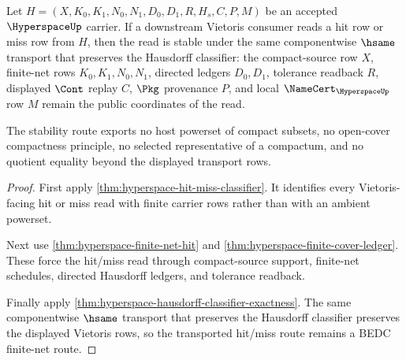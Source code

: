 \begin{theorem}
\label{thm:hyperspace-vietoris-hit-miss-stability}
Let $H=(X,K_0,K_1,N_0,N_1,D_0,D_1,R,H_s,C,P,M)$ be an accepted $\HyperspaceUp$ carrier. If a downstream Vietoris consumer reads a hit row or miss row from $H$, then the read is stable under the same componentwise $\hsame$ transport that preserves the Hausdorff classifier: the compact-source row $X$, finite-net rows $K_0,K_1,N_0,N_1$, directed ledgers $D_0,D_1$, tolerance readback $R$, displayed $\Cont$ replay $C$, $\Pkg$ provenance $P$, and local $\NameCert_{\HyperspaceUp}$ row $M$ remain the public coordinates of the read.

The stability route exports no host powerset of compact subsets, no open-cover compactness principle, no selected representative of a compactum, and no quotient equality beyond the displayed transport rows.
\end{theorem}
\begin{proof}
First apply \autoref{thm:hyperspace-hit-miss-classifier}. It identifies every Vietoris-facing hit or miss read with finite carrier rows rather than with an ambient powerset.

Next use \autoref{thm:hyperspace-finite-net-hit} and \autoref{thm:hyperspace-finite-cover-ledger}. These force the hit/miss read through compact-source support, finite-net schedules, directed Hausdorff ledgers, and tolerance readback.

Finally apply \autoref{thm:hyperspace-hausdorff-classifier-exactness}. The same componentwise $\hsame$ transport that preserves the Hausdorff classifier preserves the displayed Vietoris rows, so the transported hit/miss route remains a BEDC finite-net route.
\end{proof}

